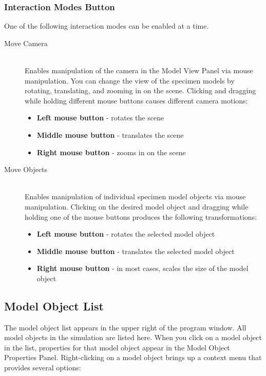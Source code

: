\documentclass[11pt,titlepage]{article}
\begin{document}
\subsubsection{Interaction Modes Button}
  
One of the following interaction modes can be enabled at a time.

\begin{description}

  \item[Move Camera] \hfill \\
  Enables manipulation of the camera in the Model View Panel via mouse manipulation. You can change the view of the specimen models by rotating, translating, and zooming in on the scene. Clicking and dragging while holding different mouse buttons causes different camera motions:

\begin{itemize}
\item \textbf{Left mouse button} - rotates the scene
\item \textbf{Middle mouse button} - translates the scene
\item \textbf{Right mouse button} - zooms in on the scene
\end{itemize}

  \item[Move Objects] \hfill \\
  Enables manipulation of individual specimen model objects via mouse manipulation. Clicking on the desired model object and dragging while holding one of the mouse buttons produces the following transformations:
  
\begin{itemize}
\item \textbf{Left mouse button} - rotates the selected model object
\item \textbf{Middle mouse button} - translates the selected model object
\item \textbf{Right mouse button} - in most cases, scales the size of the model object
\end{itemize}

\end{description}

\subsection{Model Object List}

The model object list appears in the upper right of the program window. All model objects in the simulation are listed here. When you click on a model object in the list, properties for that model object appear in the Model Object Properties Panel. Right-clicking on a model object brings up a context menu that provides several options:
\end{document}
